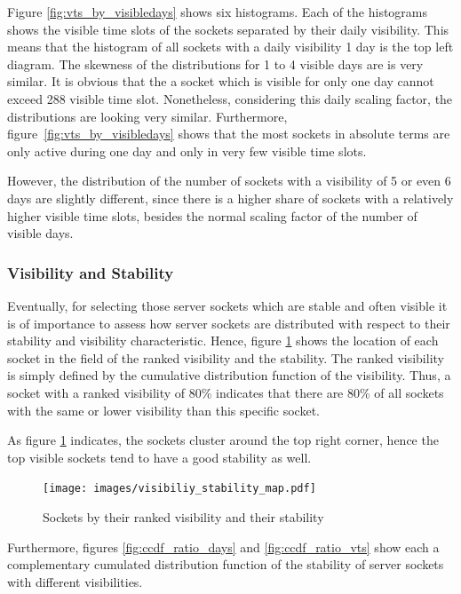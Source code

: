 Figure \ref{fig:vts_by_visibledays} shows six histograms. Each of the histograms shows the visible time slots of the sockets separated by their daily visibility. This means that the histogram of all sockets with a daily visibility 1 day is the top left diagram. 
The skewness of the distributions for 1 to 4 visible days are is very similar. 
It is obvious that the a socket which is visible for only one day cannot exceed 288 visible time slot. 
Nonetheless, considering this daily scaling factor, the distributions are looking very similar. 
Furthermore, figure \ref{fig:vts_by_visibledays} shows that the most sockets in absolute terms are only active during one day and only in very few visible time slots.

However, the distribution of the number of sockets with a visibility of 5 or even 6 days are slightly different, since there is a higher share of sockets with a relatively higher visible time slots, besides the normal scaling factor of the number of visible days. 

\subsubsection{Visibility and Stability}
Eventually, for selecting those \glspl{server socket} which are stable and often visible it is of importance to assess how \glspl{server socket} are distributed with respect to their stability and visibility characteristic.
Hence, figure \ref{fig:rankedVisibility} shows the location of each socket in the field of the ranked visibility and the stability.
The ranked visibility is simply defined by the cumulative distribution function of the visibility.
Thus, a socket with a ranked visibility of 80\% indicates that there are 80\% of all sockets with the same or lower visibility than this specific socket.

As figure \ref{fig:rankedVisibility} indicates, the sockets cluster around the top right corner, hence the top visible sockets tend to have a good stability as well. 

\begin{figure}
	[hb] \centering
	\texttt{[image: images/visibiliy\_stability\_map.pdf]}
	\caption{Sockets by their ranked visibility and their stability}
	\label{fig:rankedVisibility}
\end{figure}

Furthermore, figures \ref{fig:ccdf_ratio_days} and \ref{fig:ccdf_ratio_vts} show each a complementary cumulated distribution function of the stability of server sockets with different visibilities.

